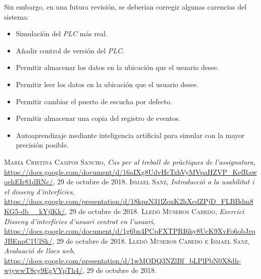 \documentclass[pdftex,11pt,a4paper]{book}
\begin{document}
Sin embargo, en una futura revisión, se deberían corregir algunas carencias del sistema:
\begin{itemize}
\item Simulación del \emph{PLC} más real.
\item Añadir control de versión del \emph{PLC}.
\item Permitir almacenar los datos en la ubicación que el usuario desee.
\item Permitir leer los datos en la ubicación que el usuario desee.
\item Permitir cambiar el puerto de escucha por defecto.
\item Permitir almacenar una copia del registro de eventos.
\item Autoaprendizaje mediante inteligencia artificial para simular con la mayor precisión posible.
\end{itemize}


%
%

\begin{thebibliography}{X}
 \textsc{María Cristina Campos Sancho},
 \textit{Cas per al treball de pràctiques de l'assignatura},
 \url{https://docs.google.com/document/d/16aIXg8UdvHcTzhVyMVpaHZVP_KefRawoehEIr81dRNc/},
  29 de octubre de 2018.
 \textsc{Ismael Sanz},
 \textit{Introducció a la usabilitat i el disseny d'interfícies},
 \url{https://docs.google.com/presentation/d/18kpzN31lZoxK2hXcdZPjD_FLBBdm8KG5-db__kYjlKk/},
  29 de octubre de 2018.
 \textsc{Lledó Museros Cabedo},
 \textit{Exercici Disseny d’interfícies d’usuari centrat en l’usuari},
 \url{https://docs.google.com/document/d/1g6bx4PCpFXTPRI6hy8UcK9XvFo6obJrpJBEnpC1UlSk/},
  29 de octubre de 2018.
 \textsc{Lledó Museros Cabedo e Ismael Sanz},
 \textit{Avaluació de llocs web},
 \url{https://docs.google.com/presentation/d/1wMODQ3NZlBf_bLPlPbN0X8dh-wjywwT8cy9EgVYpTh4/},
  29 de octubre de 2018.
\end{thebibliography}



\appendix




\end{document}
